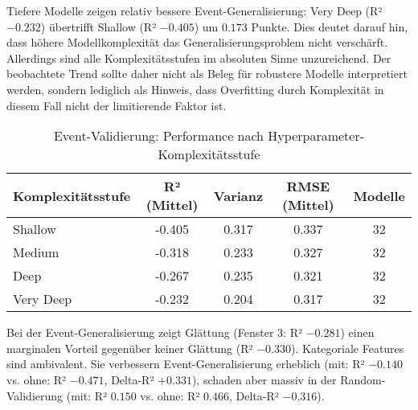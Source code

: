 Tiefere Modelle zeigen relativ bessere Event-Generalisierung: Very Deep (R² $-0.232$) übertrifft Shallow (R² $-0.405$) um $0.173$ Punkte. Dies deutet darauf hin, dass höhere Modellkomplexität das Generalisierungsproblem nicht verschärft. Allerdings sind alle Komplexitätsstufen im absoluten Sinne unzureichend. Der beobachtete Trend sollte daher nicht als Beleg für robustere Modelle interpretiert werden, sondern lediglich als Hinweis, dass Overfitting durch Komplexität in diesem Fall nicht der limitierende Faktor ist.

\begin{table}[H]
  \centering
  \begin{tabular}{lcccc}
    \toprule
    \textbf{Komplexitätsstufe} & \textbf{R² (Mittel)} & \textbf{Varianz} & \textbf{RMSE (Mittel)} & \textbf{Modelle} \\
    \midrule
    Shallow & -0.405 & 0.317 & 0.337 & 32 \\
    Medium & -0.318 & 0.233 & 0.327 & 32 \\
    Deep & -0.267 & 0.235 & 0.321 & 32 \\
    Very Deep & -0.232 & 0.204 & 0.317 & 32 \\
    \bottomrule
  \end{tabular}
  \caption{Event-Validierung: Performance nach Hyperparameter-Komplexitätsstufe}
  \label{tab:complexity_event}
\end{table}


Bei der Event-Generalisierung zeigt Glättung (Fenster 3: R² $-0.281$) einen marginalen Vorteil gegenüber keiner Glättung (R² $-0.330$). Kategoriale Features sind ambivalent. Sie verbessern Event-Generalisierung erheblich (mit: R² $-0.140$ vs. ohne: R² $-0.471$, Delta-R² $+0.331$), schaden aber massiv in der Random-Validierung (mit: R² $0.150$ vs. ohne: R² $0.466$, Delta-R² $-0.316$).

